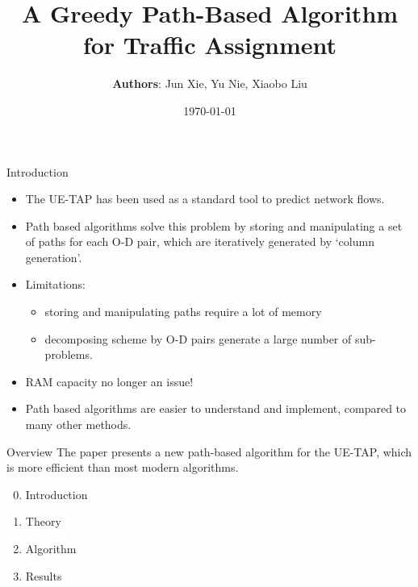 \documentclass{beamer}
\title{A Greedy Path-Based Algorithm for Traffic Assignment}
\author{\textbf{Authors}: Jun Xie, Yu Nie, Xiaobo Liu}
\date{\today}
\begin{document}
\begin{frame}
    \titlepage
\end{frame}

\begin{frame}{Introduction}
\begin{itemize}
    \item The UE-TAP has been used as a standard tool to
    predict network flows.

    \item Path based algorithms solve this problem by storing
    and manipulating
    a set of paths for each O-D pair, which are iteratively
    generated by `column generation'.

    \item Limitations: 
    \begin{itemize}
    \item storing and manipulating paths
    require a lot of memory
    \item decomposing scheme by O-D pairs
    generate a large number of sub-problems.
    \end{itemize}

\pause

    \item RAM capacity no longer an issue!

    \item Path based algorithms are easier to understand and
    implement, compared to many other methods.
\end{itemize}
\end{frame}

\begin{frame}{Overview}
The paper presents a new path-based algorithm for the
UE-TAP, which is more efficient than most modern algorithms.

\pause

\begin{enumerate}
\setcounter{enumi}{-1}
    \item Introduction
    \item Theory
    \item Algorithm
    \item Results
\end{enumerate}
\end{frame}
\end{document}
